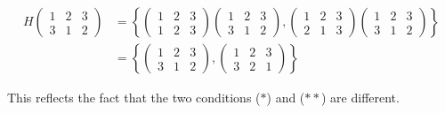 \begin{align*}
H \begin{pmatrix} 1 & 2 & 3 \\ 3 & 1 & 2 \end{pmatrix} &= \left\{ \begin{pmatrix} 1 & 2 & 3 \\ 1 & 2 & 3 \end{pmatrix}\begin{pmatrix} 1 & 2 & 3 \\ 3 & 1 & 2 \end{pmatrix}, \begin{pmatrix} 1 & 2 & 3 \\ 2 & 1 & 3 \end{pmatrix}\begin{pmatrix} 1 & 2 & 3 \\ 3 & 1 & 2 \end{pmatrix} \right\} \\
&= \left\{ \begin{pmatrix} 1 & 2 & 3 \\ 3 & 1 & 2 \end{pmatrix}, \begin{pmatrix} 1 & 2 & 3 \\ 3 & 2 & 1 \end{pmatrix} \right\}
\end{align*}

\noindent This reflects the fact that the two conditions ($*$) and ($**$) are different.